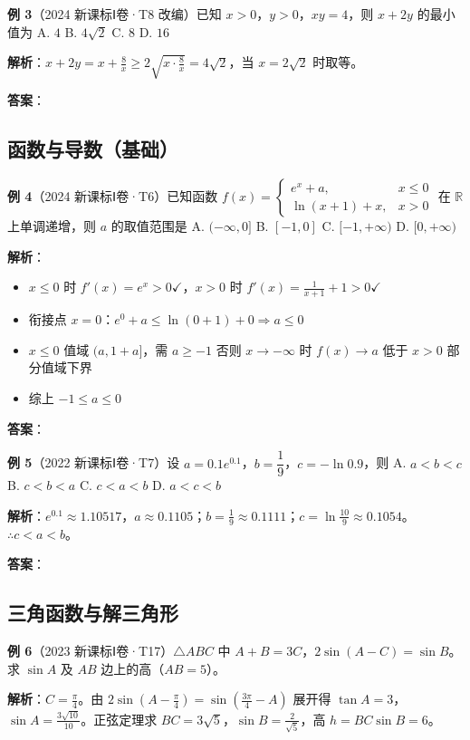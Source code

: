 \textbf{例 3}（2024 新课标Ⅰ卷·T8 改编）已知 $x>0$，$y>0$，$xy=4$，则 $x+2y$ 的最小值为
A. $4$ \quad B. $4\sqrt{2}$ \quad C. $8$ \quad D. $16$

\textbf{解析}：$x+2y = x+\frac{8}{x} \ge 2\sqrt{x\cdot\frac{8}{x}} = 4\sqrt{2}$，当 $x=2\sqrt{2}$ 时取等。

\textbf{答案}：

\subsection{函数与导数（基础）}

\textbf{例 4}（2024 新课标Ⅰ卷·T6）已知函数 $f(x) = \begin{cases} e^x + a, & x \le 0 \\ \ln(x+1) + x, & x > 0 \end{cases}$ 在 $\mathbb{R}$ 上单调递增，则 $a$ 的取值范围是
A. $(-\infty,0]$ \quad B. $[-1,0]$ \quad C. $[-1,+\infty)$ \quad D. $[0,+\infty)$

\textbf{解析}：
\begin{itemize}
  \item $x\le0$ 时 $f'(x)=e^x>0\checkmark$，$x>0$ 时 $f'(x)=\frac{1}{x+1}+1>0\checkmark$
  \item 衔接点 $x=0$：$e^0+a \le \ln(0+1)+0 \Rightarrow a\le0$
  \item $x\le0$ 值域 $(a,1+a]$，需 $a\ge -1$ 否则 $x\to-\infty$ 时 $f(x)\to a$ 低于 $x>0$ 部分值域下界
  \item 综上 $-1\le a\le0$
\end{itemize}

\textbf{答案}：

\textbf{例 5}（2022 新课标Ⅰ卷·T7）设 $a = 0.1e^{0.1}$，$b = \dfrac{1}{9}$，$c = -\ln 0.9$，则
A. $a < b < c$ \quad B. $c < b < a$ \quad C. $c < a < b$ \quad D. $a < c < b$

\textbf{解析}：$e^{0.1}\approx1.10517$，$a\approx0.1105$；$b=\frac19\approx0.1111$；$c=\ln\frac{10}{9}\approx0.1054$。$\therefore c<a<b$。

\textbf{答案}：

\subsection{三角函数与解三角形}

\textbf{例 6}（2023 新课标Ⅰ卷·T17）$\triangle ABC$ 中 $A+B=3C$，$2\sin(A-C)=\sin B$。求 $\sin A$ 及 $AB$ 边上的高（$AB=5$）。

\textbf{解析}：$C=\frac{\pi}{4}$。由 $2\sin(A-\frac{\pi}{4})=\sin(\frac{3\pi}{4}-A)$ 展开得 $\tan A=3$，$\sin A=\frac{3\sqrt{10}}{10}$。正弦定理求 $BC=3\sqrt{5}$，$\sin B=\frac{2}{\sqrt{5}}$，高 $h=BC\sin B=6$。


